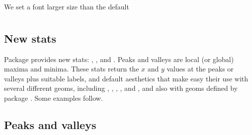 \documentclass[paper=a4,10pt,div=17,headsepline,BCOR=12mm,twoside,open=right]{scrbook}\usepackage{knitr}
\begin{document}
\begin{knitrout}\footnotesize
{}\color{fgcolor}\begin{kframe}
\begin{alltt}
\end{alltt}
\end{kframe}
\end{knitrout}

We set a font larger size than the default
\begin{knitrout}\footnotesize
{}\color{fgcolor}\begin{kframe}
\begin{alltt}
\hlstd{(}\hlstd{(}\hlstd{))}
\end{alltt}
\end{kframe}
\end{knitrout}




\section[ggpmisc]{\ggpmisc}

\subsection{New stats}

Package \ggpmisc provides new stats: , , and . Peaks and valleys are local (or global) maxima and minima. These stats return the $x$ and $y$ values at the peaks or valleys plus suitable labels, and default aesthetics that make easy their use with several different geoms, including , , , ,  and , and also with geoms defined by package \ggrepel. Some examples follow.

\subsection{Peaks and valleys}
\begin{knitrout}\footnotesize
{}\color{fgcolor}\begin{kframe}
\begin{alltt}
 \hlkwb{<-} \hlstd{(} \hlstd{=} \hlstd{(}  \hlstd{=} 
\end{alltt}
\end{kframe}
\end{knitrout}
 
\end{document}

